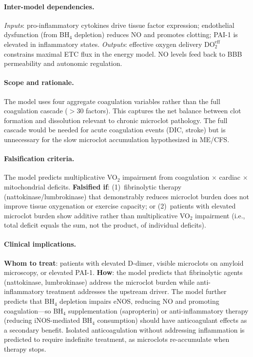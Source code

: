\paragraph{Inter-model dependencies.}
\emph{Inputs}: pro-inflammatory cytokines drive tissue factor expression; endothelial dysfunction (from BH$_4$ depletion) reduces NO and promotes clotting; PAI-1 is elevated in inflammatory states. \emph{Outputs}: effective oxygen delivery $\text{DO}_2^{\text{eff}}$ constrains maximal ETC flux in the energy model. NO levels feed back to BBB permeability and autonomic regulation.

\paragraph{Scope and rationale.}
The model uses four aggregate coagulation variables rather than the full coagulation cascade ($>$30 factors). This captures the net balance between clot formation and dissolution relevant to chronic microclot pathology. The full cascade would be needed for acute coagulation events (DIC, stroke) but is unnecessary for the slow microclot accumulation hypothesized in ME/CFS.

\paragraph{Falsification criteria.}
The model predicts multiplicative VO$_2$ impairment from coagulation $\times$ cardiac $\times$ mitochondrial deficits. \textbf{Falsified if}: (1)~fibrinolytic therapy (nattokinase/lumbrokinase) that demonstrably reduces microclot burden does not improve tissue oxygenation or exercise capacity; or (2)~patients with elevated microclot burden show additive rather than multiplicative VO$_2$ impairment (i.e., total deficit equals the sum, not the product, of individual deficits).

\paragraph{Clinical implications.}
\textbf{Whom to treat}: patients with elevated D-dimer, visible microclots on amyloid microscopy, or elevated PAI-1. \textbf{How}: the model predicts that fibrinolytic agents (nattokinase, lumbrokinase) address the microclot burden while anti-inflammatory treatment addresses the upstream driver. The model further predicts that BH$_4$ depletion impairs eNOS, reducing NO and promoting coagulation---so BH$_4$ supplementation (sapropterin) or anti-inflammatory therapy (reducing iNOS-mediated BH$_4$ consumption) should have anticoagulant effects as a secondary benefit. Isolated anticoagulation without addressing inflammation is predicted to require indefinite treatment, as microclots re-accumulate when therapy stops.
